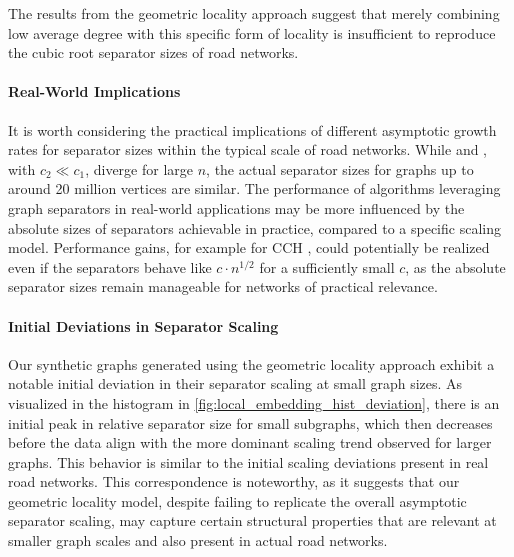 The results from the geometric locality approach suggest that merely combining low average degree with this specific form of locality is insufficient to reproduce the cubic root separator sizes of road networks.

\paragraph{Real-World Implications}

It is worth considering the practical implications of different asymptotic growth rates for separator sizes within the typical scale of road networks.
While  and , with \(c_2 \ll c_1\), diverge for large \(n\), the actual separator sizes for graphs up to around 20 million vertices are similar.
The performance of algorithms leveraging graph separators in real-world applications may be more influenced by the absolute sizes of separators achievable in practice, compared to a specific scaling model.
Performance gains, for example for CCH \cite{dibbelt_customizable_2016}, could potentially be realized even if the separators behave like \(c \cdot n^{1/2}\) for a sufficiently small \(c\), as the absolute separator sizes remain manageable for networks of practical relevance.

\paragraph{Initial Deviations in Separator Scaling}

Our synthetic graphs generated using the geometric locality approach exhibit a notable initial deviation in their separator scaling at small graph sizes.
As visualized in the histogram in \cref{fig:local_embedding_hist_deviation}, there is an initial peak in relative separator size for small subgraphs, which then decreases before the data align with the more dominant scaling trend observed for larger graphs.
This behavior is similar to the initial scaling deviations present in real road networks.
This correspondence is noteworthy, as it suggests that our geometric locality model, despite failing to replicate the overall asymptotic separator scaling, may capture certain structural properties that are relevant at smaller graph scales and also present in actual road networks.


